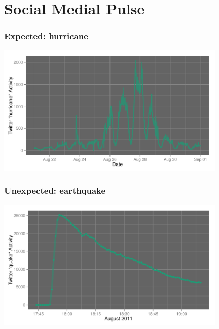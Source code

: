\documentclass{beamer}
\begin{document}
\section{Social Medial Pulse}
{
\begin{frame}
\textcolor{black} {
\hfill \Huge \insertsection}
\end{frame}
}




\begin{frame}\frametitle{Expected: hurricane}
  \begin{center}
    \includegraphics[width=11cm]{./imgs/SMP_hurricane.pdf}
  \end{center}
\end{frame}

\begin{frame}\frametitle{Unexpected: earthquake}
  \begin{center}
    \includegraphics[width=11cm]{./imgs/SMP_va_quake.pdf}
  \end{center}
\end{frame}
\end{document}
